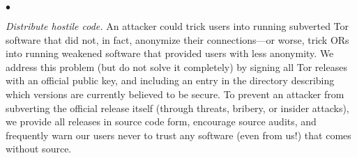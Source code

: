 \documentclass[times,10pt,twocolumn]{article}
\newenvironment{tightlist}{\begin{list}{$\bullet$}{
  \setlength{\itemsep}{0mm}
    \setlength{\parsep}{0mm}
    }}{\end{list}}
\begin{document}
\begin{tightlist}
\item \emph{Distribute hostile code.} An attacker could trick users
  into running subverted Tor software that did not, in fact, anonymize
  their connections---or worse, trick ORs into running weakened
  software that provided users with less anonymity.  We address this
  problem (but do not solve it completely) by signing all Tor releases
  with an official public key, and including an entry in the directory
  describing which versions are currently believed to be secure.  To
  prevent an attacker from subverting the official release itself
  (through threats, bribery, or insider attacks), we provide all
  releases in source code form, encourage source audits, and
  frequently warn our users never to trust any software (even from
  us!) that comes without source.
\end{tightlist}
\end{document}
